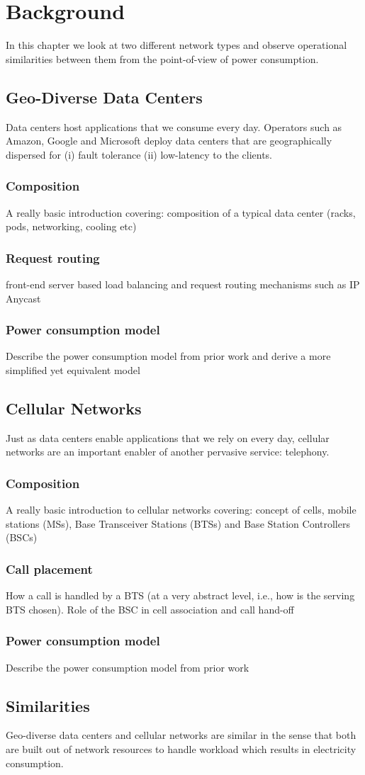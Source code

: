 \chapter{Background}
\label{chap:background}
In this chapter we look at two different network types and observe operational similarities between them from the point-of-view of power consumption.
\section{Geo-Diverse Data Centers} Data centers host applications that we consume every day. Operators such as Amazon, Google and Microsoft deploy data centers that are geographically dispersed for (i) fault tolerance (ii) low-latency to the clients.
\subsection{Composition}
A really basic introduction covering: composition of a typical data center (racks, pods, networking, cooling etc)
\subsection{Request routing} front-end server based load balancing and request routing mechanisms such as IP Anycast
\subsection{Power consumption model} Describe the power consumption model from prior work and derive a more simplified yet equivalent model

\section{Cellular Networks} Just as data centers enable applications that we rely on every day, cellular networks are an important enabler of another pervasive service: telephony. 
\subsection{Composition} A really basic introduction to cellular networks covering: concept of cells, mobile stations (MSs), Base Transceiver Stations (BTSs) and Base Station Controllers (BSCs) 
\subsection{Call placement} How a call is handled by a BTS (at a very abstract level, i.e., how is the serving BTS chosen). Role of the BSC in cell association and call hand-off
\subsection{Power consumption model} Describe the power consumption model from prior work

\section{Similarities} Geo-diverse data centers and cellular networks are similar in the sense that both are built out of network resources to handle workload which results in electricity consumption. 